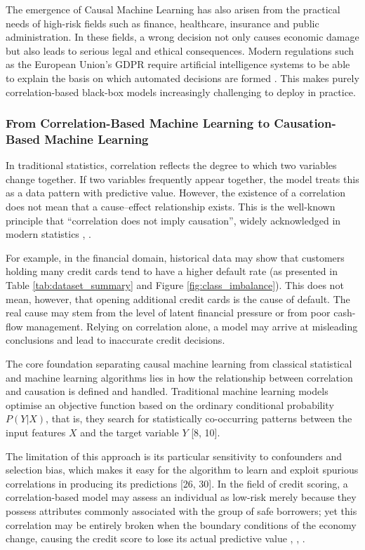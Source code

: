 The emergence of Causal Machine Learning has also arisen from the practical needs of high-risk fields such as finance, healthcare, insurance and public administration. In these fields, a wrong decision not only causes economic damage but also leads to serious legal and ethical consequences. Modern regulations such as the European Union's GDPR require artificial intelligence systems to be able to explain the basis on which automated decisions are formed \cite{european2016gdpr}. This makes purely correlation-based black-box models increasingly challenging to deploy in practice.


\subsubsection{From Correlation-Based Machine Learning to Causation-Based Machine Learning}
\noindent
In traditional statistics, correlation reflects the degree to which two variables change together. If two variables frequently appear together, the model treats this as a data pattern with predictive value. However, the existence of a correlation does not mean that a cause--effect relationship exists. This is the well-known principle that ``correlation does not imply causation'', widely acknowledged in modern statistics \cite{pearl2009causality}, \cite{spirtes2000causation}.

For example, in the financial domain, historical data may show that customers holding many credit cards tend to have a higher default rate (as presented in Table \ref{tab:dataset_summary} and Figure \ref{fig:class_imbalance}). This does not mean, however, that opening additional credit cards is the cause of default. The real cause may stem from the level of latent financial pressure or from poor cash-flow management. Relying on correlation alone, a model may arrive at misleading conclusions and lead to inaccurate credit decisions.

The core foundation separating causal machine learning from classical statistical and machine learning algorithms lies in how the relationship between correlation and causation is defined and handled. Traditional machine learning models optimise an objective function based on the ordinary conditional probability $P(Y|X)$, that is, they search for statistically co-occurring patterns between the input features $X$ and the target variable $Y$ [8, 10].

The limitation of this approach is its particular sensitivity to confounders and selection bias, which makes it easy for the algorithm to learn and exploit spurious correlations in producing its predictions [26, 30]. In the field of credit scoring, a correlation-based model may assess an individual as low-risk merely because they possess attributes commonly associated with the group of safe borrowers; yet this correlation may be entirely broken when the boundary conditions of the economy change, causing the credit score to lose its actual predictive value \cite{stiglitz1981credit}, \cite{hand1997statistical}, \cite{liu2024credit}.


